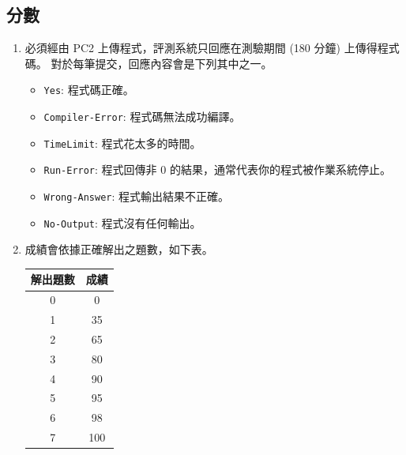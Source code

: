 \subsection*{分數}
\begin{enumerate}
    \item 必須經由 PC2 上傳程式，評測系統只回應在測驗期間 (180 分鐘) 上傳得程式碼。 對於每筆提交，回應內容會是下列其中之一。
        \begin{itemize}
            \item \texttt{Yes}: 程式碼正確。
            \item \texttt{Compiler-Error}: 程式碼無法成功編譯。
            \item \texttt{TimeLimit}: 程式花太多的時間。
            \item \texttt{Run-Error}: 程式回傳非 0 的結果，通常代表你的程式被作業系統停止。
            \item \texttt{Wrong-Answer}: 程式輸出結果不正確。
            \item \texttt{No-Output}: 程式沒有任何輸出。
        \end{itemize}
    \item 成績會依據正確解出之題數，如下表。
        \begin{center}
            \begin{tabular}{cc}
                \toprule
                    解出題數 & 成績 \\
                \midrule
                    0 & 0 \\
                    1 & 35 \\
                    2 & 65 \\
                    3 & 80 \\
                    4 & 90 \\
                    5 & 95 \\
                    6 & 98 \\
                    7 & 100 \\
                \bottomrule
            \end{tabular}
        \end{center}
\end{enumerate}
\newpage
